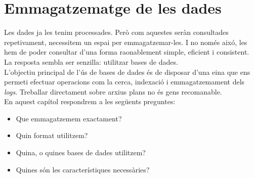 \chapter{Emmagatzematge de les dades}\label{ch:log-storing}

Les dades ja les tenim processades.
Però com aquestes seràn consultades repetivament, necessitem un espai per emmagatzemar-les.
I no només aixó, les hem de poder consultar d'una forma raonablement simple, eficient i consistent.
La resposta sembla ser senzilla: utilitzar bases de dades. \\

\noindent
L’objectiu principal de l’ús de bases de dades és de disposar d’una eina que ens permeti efectuar operacions com la cerca, indexació i emmagatzemament dels \textit{\gls{log}s}.
Treballar directament sobre arxius plans no és gens recomanable. \\

\noindent
En aquest capítol respondrem a les següents preguntes:
\begin{itemize}
    \item Que emmagatzemem exactament?
    \item Quin format utilitzem?
    \item Quina, o quines bases de dades utilitzem?
    \item Quines són les característiques necessàries?
\end{itemize}

\clearpage

\clearpage

